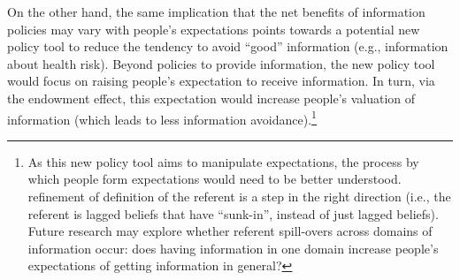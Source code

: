 On the other hand, the same implication that the net benefits of information policies may vary with people’s expectations points towards a potential new policy tool to reduce the tendency to avoid \enquote{good} information (e.g., information about health risk). Beyond policies to provide information, the new policy tool would focus on raising people’s expectation to receive information. In turn, via the endowment effect, this expectation would increase people’s valuation of information (which leads to less information avoidance).\footnote{As this new policy tool aims to manipulate expectations, the process by which people form expectations would need to be better understood.  refinement of  definition of the referent is a step in the right direction (i.e., the referent is lagged beliefs that have \enquote{sunk-in}, instead of just lagged beliefs). Future research may explore whether referent spill-overs across domains of information occur: does having information in one domain increase people’s expectations of getting information in general?}


\clearpage

